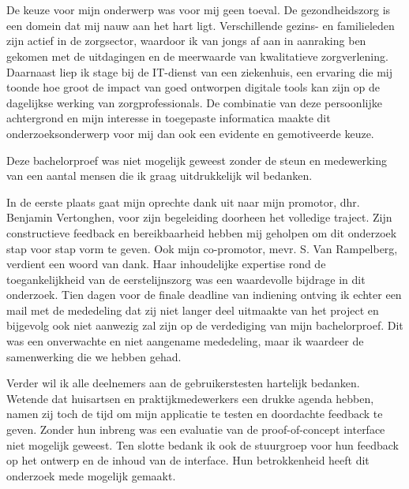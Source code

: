 
\chapter*{}%
\label{ch:voorwoord}

De keuze voor mijn onderwerp was voor mij geen toeval. 
De gezondheidszorg is een domein dat mij nauw aan het hart ligt. 
Verschillende gezins- en familieleden zijn actief in de zorgsector, waardoor ik van jongs af aan in aanraking ben gekomen met de uitdagingen en de meerwaarde van kwalitatieve zorgverlening. 
Daarnaast liep ik stage bij de IT-dienst van een ziekenhuis, een ervaring die mij toonde hoe groot de impact van goed ontworpen digitale tools kan zijn op de dagelijkse werking van zorgprofessionals. 
De combinatie van deze persoonlijke achtergrond en mijn interesse in toegepaste informatica maakte dit onderzoeksonderwerp voor mij dan ook een evidente en gemotiveerde keuze.
\medskip

Deze bachelorproef was niet mogelijk geweest zonder de steun en medewerking van een aantal mensen die ik graag uitdrukkelijk wil bedanken.\medskip

In de eerste plaats gaat mijn oprechte dank uit naar mijn promotor, dhr. Benjamin Vertonghen, voor zijn begeleiding doorheen het volledige traject. 
Zijn constructieve feedback en bereikbaarheid hebben mij geholpen om dit onderzoek stap voor stap vorm te geven.
Ook mijn co-promotor, mevr. S. Van Rampelberg, verdient een woord van dank. 
Haar inhoudelijke expertise rond de toegankelijkheid van de eerstelijnszorg was een waardevolle bijdrage in dit onderzoek. 
Tien dagen voor de finale deadline van indiening ontving ik echter een mail met de mededeling dat zij niet langer deel uitmaakte van het project en bijgevolg ook niet aanwezig zal zijn op de verdediging van mijn bachelorproef. 
Dit was een onverwachte en niet aangename mededeling, maar ik waardeer de samenwerking die we hebben gehad.\medskip 

Verder wil ik alle deelnemers aan de gebruikerstesten hartelijk bedanken. 
Wetende dat huisartsen en praktijkmedewerkers  een drukke agenda hebben, namen zij toch de tijd om mijn applicatie te testen en doordachte feedback te geven. 
Zonder hun inbreng was een evaluatie van de proof-of-concept interface niet mogelijk geweest.
Ten slotte bedank ik ook de stuurgroep voor hun feedback op het ontwerp en de inhoud van de interface. 
Hun betrokkenheid heeft dit onderzoek mede mogelijk gemaakt.
